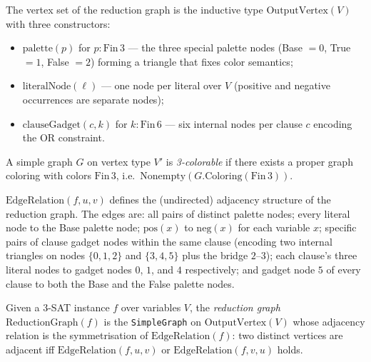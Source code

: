 \begin{definition}
\label{SATtoColor.OutputVertex}
\leanok
{}
The vertex set of the reduction graph is the inductive type
$\mathrm{OutputVertex}(V)$ with three constructors:
\begin{itemize}
  \item $\mathrm{palette}(p)$ for $p : \mathrm{Fin}\,3$ --- the three special
        palette nodes (Base $= 0$, True $= 1$, False $= 2$) forming a triangle
        that fixes color semantics;
  \item $\mathrm{literalNode}(\ell)$ --- one node per literal over $V$
        (positive and negative occurrences are separate nodes);
  \item $\mathrm{clauseGadget}(c, k)$ for $k : \mathrm{Fin}\,6$ --- six
        internal nodes per clause $c$ encoding the OR constraint.
\end{itemize}
\end{definition}

\begin{definition}[3-colorability]
\label{SATtoColor.Is3Colorable}
\leanok
A simple graph $G$ on vertex type $V'$ is \emph{3-colorable} if there exists a
proper graph coloring with colors $\mathrm{Fin}\,3$, i.e.\
$\mathrm{Nonempty}(G.\mathrm{Coloring}(\mathrm{Fin}\,3))$.
\end{definition}

\begin{definition}
\label{SATtoColor.EdgeRelation}
\leanok
{}
$\mathrm{EdgeRelation}(f, u, v)$ defines the (undirected) adjacency structure
of the reduction graph.  The edges are:
all pairs of distinct palette nodes;
every literal node to the Base palette node;
$\mathrm{pos}(x)$ to $\mathrm{neg}(x)$ for each variable $x$;
specific pairs of clause gadget nodes within the same clause (encoding two
internal triangles on nodes $\{0,1,2\}$ and $\{3,4,5\}$ plus the bridge
$2$--$3$);
each clause's three literal nodes to gadget nodes $0$, $1$, and $4$
respectively;
and gadget node $5$ of every clause to both the Base and the False palette
nodes.
\end{definition}

\begin{definition}
\label{SATtoColor.ReductionGraph}
\leanok
{}
Given a 3-SAT instance $f$ over variables $V$, the \emph{reduction graph}
$\mathrm{ReductionGraph}(f)$ is the \texttt{SimpleGraph} on
$\mathrm{OutputVertex}(V)$ whose adjacency relation is the symmetrisation of
$\mathrm{EdgeRelation}(f)$: two distinct vertices are adjacent iff
$\mathrm{EdgeRelation}(f, u, v)$ or $\mathrm{EdgeRelation}(f, v, u)$ holds.
\end{definition}

